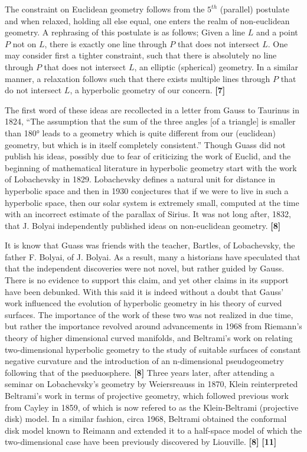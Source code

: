 \documentclass[12pt]{article}
\begin{document}
The constraint on Euclidean geometry follows from the $5^{th}$ (parallel) postulate and when relaxed, 
holding all else equal, one enters the realm of non-euclidean geometry. 
A rephrasing of this postulate is as follows; Given a line $ L $ and a point $ P $ not on $ L $, 
there is exactly one line through $ P $ that does not intersect $ L $.
One may consider first a tighter constraint, such that there is absolutely no line 
through $ P $ that does not intersect $ L $, an elliptic (spherical) geometry. 
In a similar manner, a relaxation follows such that there exists multiple lines 
through $ P $ that do not intersect $ L $, a hyperbolic geometry of our concern. \textbf{[7]} 

\hspace{5mm}
The first word of these ideas are recollected in a letter from Gauss to Taurinus in 1824, 
``The assumption that the sum of the three angles [of a triangle] is smaller than 180° leads to a geometry 
which is quite different from our (euclidean) geometry, but which is in itself completely consistent.'' 
Though Guass did not publish his ideas, possibly due to fear of criticizing the work of Euclid, 
and the beginning of mathematical literature in hyperbolic geometry start with the work of Lobachevsky in 1829. 
Lobachevsky defines a natural unit for distance in hyperbolic space and then in 1930 conjectures that if we were to live 
in such a hyperbolic space, then our solar system is extremely small, computed at the time with an incorrect estimate of the parallax of Sirius.  
It was not long after, 1832, that J. Bolyai independently published ideas on non-euclidean geometry. \textbf{[8]} 

\hspace{5mm}
It is know that Guass was friends with the teacher, Bartles, of Lobachevsky, the father F. Bolyai, of J. Bolyai. 
As a result, many a historians have speculated that that the independent discoveries were not novel, but rather guided by Gauss. 
There is no evidence to support this claim, and yet other claims in its support have been debunked.
With this said it is indeed without a doubt that Gauss' work influenced the evolution of hyperbolic geometry in his theory of curved surfaces. 
The importance of the work of these two was not realized in due time, but rather the importance revolved around advancements in 1968 from
Riemann's theory of higher dimensional curved manifolds, and Beltrami's work on relating two-dimensional hyperbolic geometry to the 
study of suitable surfaces of constant negative curvature and the introduction of an n-dimensional pseudogeometry following that of the pseduosphere. \textbf{[8]} 
Three years later, after attending a seminar on Lobachevsky's geometry by Weiersreauss in 1870, Klein reinterpreted Beltrami's work in terms of projective geometry, 
which followed previous work from Cayley in 1859, of which is now refered to as the Klein-Beltrami (projective disk) model.
In a similar fashion, circa 1968, Beltrami obtained the conformal disk model known to Reimann and extended it to a half-space model 
of which the two-dimensional case have been previously discovered by Liouville. \textbf{[8]} \textbf{[11]} 
\end{document}
